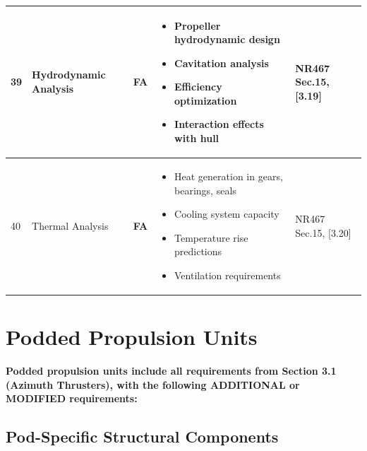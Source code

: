 \documentclass[11pt,a4paper]{report}
\newcommand{\fa}{\textbf{\textcolor{warningred}{FA}}}
\begin{document}
\begin{longtable}{|p{0.5cm}|p{5cm}|p{1.5cm}|p{5.5cm}|p{2cm}|}
39 & Hydrodynamic Analysis & \fa{} & 
\begin{itemize}[leftmargin=*,nosep]
\item Propeller hydrodynamic design
\item Cavitation analysis
\item Efficiency optimization
\item Interaction effects with hull
\end{itemize} & NR467 Sec.15, [3.19] \\
\hline

40 & Thermal Analysis & \fa{} & 
\begin{itemize}[leftmargin=*,nosep]
\item Heat generation in gears, bearings, seals
\item Cooling system capacity
\item Temperature rise predictions
\item Ventilation requirements
\end{itemize} & NR467 Sec.15, [3.20] \\
\hline

\end{longtable}

\newpage

\section{Podded Propulsion Units}

\textbf{Podded propulsion units include all requirements from Section 3.1 (Azimuth Thrusters), with the following ADDITIONAL or MODIFIED requirements:}

\subsection{Pod-Specific Structural Components}
\end{document}
